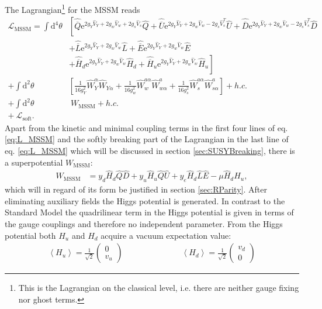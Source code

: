 The Lagrangian\footnote{This is the Lagrangian on the classical level, i.e. there are neither gauge fixing nor ghost terms.} for the MSSM reads
\begin{align}
\mathcal{L}_{\mathrm{MSSM}} = \int \mathrm{d}^4 \theta & \left[ \hat{\overline{Q}}\mathrm{e}^{2g_Y \hat{V}_Y + 2g_w\hat{V}_w + 2g_s\hat{V}_s}\hat{Q} + \hat{\overline{U}}\mathrm{e}^{2g_Y \hat{V}_Y + 2g_w\hat{V}_w - 2g_s\hat{V}^T_s}\hat{U} + \hat{\overline{D}}\mathrm{e}^{2g_Y \hat{V}_Y + 2g_w\hat{V}_w - 2g_s\hat{V}^T_s}\hat{D} \right.\nonumber\\
 & + \hat{\overline{L}}\mathrm{e}^{2g_Y \hat{V}_Y + 2g_w\hat{V}_w}\hat{L} + \hat{\overline{E}}\mathrm{e}^{2g_Y \hat{V}_Y + 2g_w\hat{V}_w}\hat{E}\nonumber\\
 & + \left. \hat{\overline{H}}_d\mathrm{e}^{2g_Y \hat{V}_Y + 2g_w\hat{V}_w}\hat{H}_d + \hat{\overline{H}}_u\mathrm{e}^{2g_Y \hat{V}_Y + 2g_w\hat{V}_w}\hat{H}_u \right]\nonumber\\
 + \int \mathrm{d}^2\theta & \left[ \frac{1}{16g_Y^2} \hat{W}_Y^{\alpha}\hat{W}_{Y\alpha} + \frac{1}{16g_w^{2}} \hat{W}_w^{a\alpha}\hat{W}^a_{w\alpha} + \frac{1}{16g_s^2} \hat{W}_s^{a\alpha}\hat{W}^a_{s\alpha} \right] + h.c.\nonumber\\
 + \int \mathrm{d}^2\theta&\ W_{\mathrm{MSSM}} + h.c.\nonumber\\
 +\  \mathcal{L}_{\mathrm{soft}}.\ &\label{eq:L_MSSM}
\end{align}
Apart from the kinetic and minimal coupling terms in the first four lines of eq. \eqref{eq:L_MSSM} and the softly breaking part of the Lagrangian in the last line of eq. \eqref{eq:L_MSSM} which will be discussed in section \ref{sec:SUSYBreaking}, there is a superpotential $W_{\mathrm{MSSM}}$:
\begin{align}
W_\mathrm{{MSSM}} &= y_d \hat{H}_d \hat{Q} \hat{D} + y_u \hat{H}_u \hat{Q} \hat U + y_e \hat{H}_d \hat{L} \hat{E} - \mu \hat{H}_d \hat{H}_u,\label{eq:W_MSSM}
\end{align}
which will in regard of its form be justified in section \ref{sec:RParity}. After eliminating auxiliary fields the Higgs potential is generated. In contrast to the Standard Model the quadrilinear term in the Higgs potential is given in terms of the gauge couplings and therefore no independent parameter. From the Higgs potential both $H_u$ and $H_d$ acquire a vacuum expectation value:
\begin{align}
\left\langle H_u \right\rangle = \frac{1}{\sqrt{2}}\begin{pmatrix}
0 \\ v_u
\end{pmatrix} \hspace{3cm} 
\left\langle H_d \right\rangle = \frac{1}{\sqrt{2}}\begin{pmatrix}
v_d \\ 0
\end{pmatrix}
\end{align}
